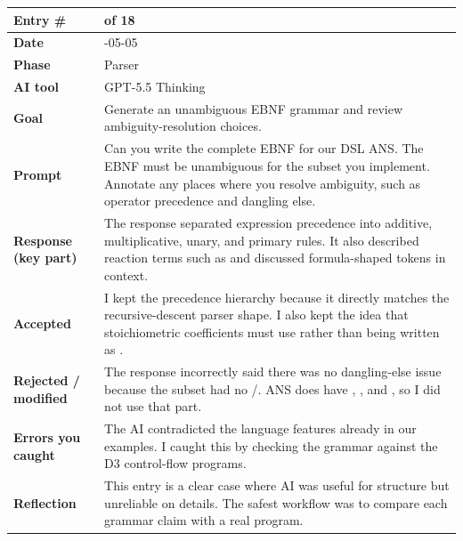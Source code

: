 \documentclass[11pt,a4paper]{article}
\newcommand{\code}[1]{\texttt{\detokenize{#1}}}
\newcommand{\entrygap}{\vspace{8pt}}
\newenvironment{journalentry}{%
  \begin{center}\small\renewcommand{\arraystretch}{1.22}%
  \begin{tabular}{|>{\columncolor{anscodebg}\bfseries}p{3.0cm}|>{\RaggedRight\arraybackslash}p{12.25cm}|}%
  \hline
}{%
  \end{tabular}\end{center}\entrygap
}
\begin{document}
\begin{journalentry}
Entry \# & 6 of 18 \\ \hline
Date & 2026-05-05 \\ \hline
Phase & Parser \\ \hline
AI tool & GPT-5.5 Thinking \\ \hline
Goal & Generate an unambiguous EBNF grammar and review ambiguity-resolution choices. \\ \hline
Prompt & Can you write the complete EBNF for our DSL ANS. The EBNF must be unambiguous for the subset you implement. Annotate any places where you resolve ambiguity, such as operator precedence and dangling else. \\ \hline
Response (key part) & The response separated expression precedence into additive, multiplicative, unary, and primary rules. It also described reaction terms such as \code{2*O2} and discussed formula-shaped tokens in context. \\ \hline
Accepted & I kept the precedence hierarchy because it directly matches the recursive-descent parser shape. I also kept the idea that stoichiometric coefficients must use \code{*} rather than being written as \code{2O2}. \\ \hline
Rejected / modified & The response incorrectly said there was no dangling-else issue because the subset had no \code{if}/\code{else}. ANS does have \code{if}, \code{elif}, and \code{else}, so I did not use that part. \\ \hline
Errors you caught & The AI contradicted the language features already in our examples. I caught this by checking the grammar against the D3 control-flow programs. \\ \hline
Reflection & This entry is a clear case where AI was useful for structure but unreliable on details. The safest workflow was to compare each grammar claim with a real program. \\ \hline
\end{journalentry}
\end{document}
